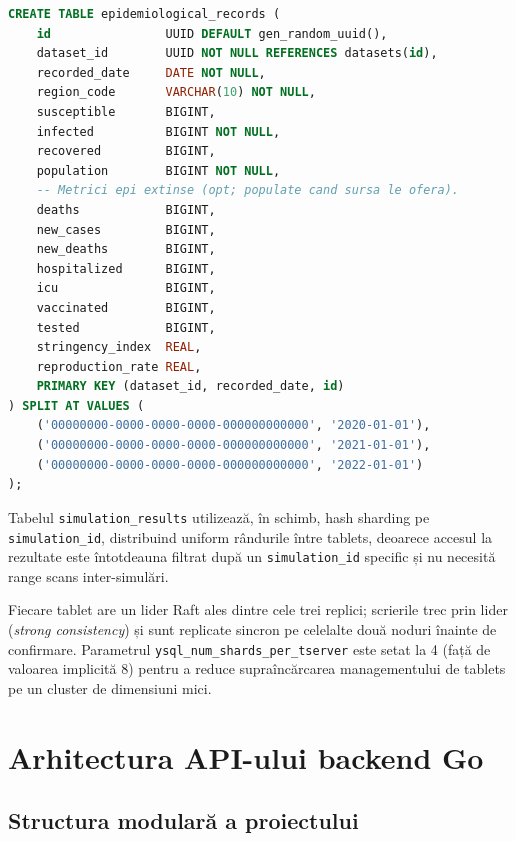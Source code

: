 \begin{lstlisting}[language=SQL, caption={DDL de producție al tabelului \texttt{epidemiological\_records} cu range sharding presplit pe cheie temporală.}]
CREATE TABLE epidemiological_records (
    id                UUID DEFAULT gen_random_uuid(),
    dataset_id        UUID NOT NULL REFERENCES datasets(id),
    recorded_date     DATE NOT NULL,
    region_code       VARCHAR(10) NOT NULL,
    susceptible       BIGINT,
    infected          BIGINT NOT NULL,
    recovered         BIGINT,
    population        BIGINT NOT NULL,
    -- Metrici epi extinse (opt; populate cand sursa le ofera).
    deaths            BIGINT,
    new_cases         BIGINT,
    new_deaths        BIGINT,
    hospitalized      BIGINT,
    icu               BIGINT,
    vaccinated        BIGINT,
    tested            BIGINT,
    stringency_index  REAL,
    reproduction_rate REAL,
    PRIMARY KEY (dataset_id, recorded_date, id)
) SPLIT AT VALUES (
    ('00000000-0000-0000-0000-000000000000', '2020-01-01'),
    ('00000000-0000-0000-0000-000000000000', '2021-01-01'),
    ('00000000-0000-0000-0000-000000000000', '2022-01-01')
);
\end{lstlisting}

Tabelul \texttt{simulation\_results} utilizează, în schimb, hash sharding pe
\texttt{simulation\_id}, distribuind uniform rândurile între tablets, deoarece
accesul la rezultate este întotdeauna filtrat după un \texttt{simulation\_id}
specific și nu necesită range scans inter-simulări.

Fiecare tablet are un lider Raft ales dintre cele trei replici; scrierile trec
prin lider (\emph{strong consistency}) și sunt replicate sincron pe celelalte
două noduri înainte de confirmare. Parametrul
\texttt{ysql\_num\_shards\_per\_tserver} este setat la 4 (față de valoarea
implicită 8) pentru a reduce supraîncărcarea managementului de tablets pe un
cluster de dimensiuni mici.

\section{Arhitectura API-ului backend Go}
\label{sec:arhitectura_api}

\subsection{Structura modulară a proiectului}
\label{subsec:structura_go}

